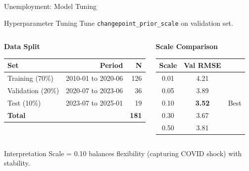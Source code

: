 \documentclass[9pt, aspectratio=169, t]{beamer}
\begin{document}
\begin{frame}{Unemployment: Model Tuning}
    \vspace{-0.1cm}
    {\footnotesize
    \begin{block}{Hyperparameter Tuning}
        Tune \texttt{changepoint\_prior\_scale} on validation set.
    \end{block}

    \vspace{0.2cm}

    \begin{columns}[T]
        \begin{center}
        \textbf{Data Split}
        \begin{tabular}{lrr}
            \toprule
            \textbf{Set} & \textbf{Period} & \textbf{N} \\
            \midrule
            Training (70\%) & 2010-01 to 2020-06 & 126 \\
            Validation (20\%) & 2020-07 to 2023-06 & 36 \\
            Test (10\%) & 2023-07 to 2025-01 & 19 \\
            \midrule
            \textbf{Total} & & \textbf{181} \\
            \bottomrule
        \end{tabular}
        \end{center}

        \begin{center}
        \textbf{Scale Comparison}
        \begin{tabular}{ccc}
            \toprule
            \textbf{Scale} & \textbf{Val RMSE} & \\
            \midrule
            0.01 & 4.21 & \\
            0.05 & 3.89 & \\
            \rowcolor{Forest!20} 0.10 & \textbf{3.52} & Best \\
            0.30 & 3.67 & \\
            0.50 & 3.81 & \\
            \bottomrule
        \end{tabular}
        \end{center}
    \end{columns}

    \vspace{0.3cm}

    \begin{alertblock}{Interpretation}
        Scale = 0.10 balances flexibility (capturing COVID shock) with stability.
    \end{alertblock}
    }
\end{frame}
\end{document}
